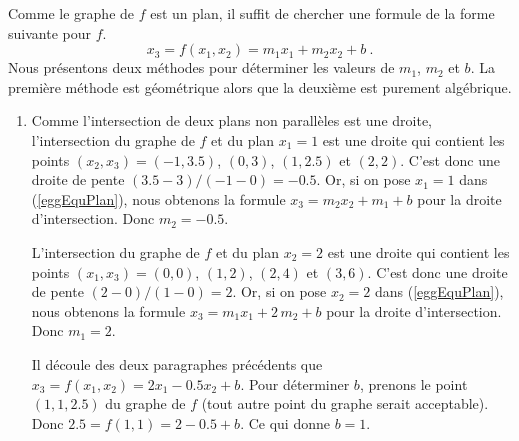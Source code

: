 {\begin{egg}
Comme le graphe de $f$ est un plan, il suffit de chercher une formule
de la forme suivante pour $f$.
\begin{equation}\label{eggEquPlan}
  x_3 = f(x_1,x_2)=m_1 x_1 + m_2 x_2 + b \ .
\end{equation}
Nous présentons deux méthodes pour déterminer les valeurs de $m_1$,
$m_2$ et $b$.  La première méthode est géométrique alors que la
deuxième est purement algébrique.

\begin{enumerate}
\item  Comme l'intersection de deux plans non parallèles est une droite,
l'intersection du graphe de $f$ et du plan $x_1=1$ est une droite qui
contient les points $(x_2,x_3) = (-1, 3.5)$, $(0,3)$, $(1,2.5)$ et
$(2,2)$.  C'est donc une droite de pente
$(3.5-3)/(-1-0) = -0.5$.  Or, si on pose $x_1=1$ dans
(\ref{eggEquPlan}), nous obtenons la formule
$x_3= m_2 x_2 + m_1 + b$ pour la droite d'intersection.  Donc
$m_2 = -0.5$.

L'intersection du graphe de $f$ et du plan $x_2=2$ est une droite qui
contient les points $(x_1,x_3) = (0, 0)$, $(1,2)$, $(2,4)$ et $(3,6)$.
C'est donc une droite de pente $(2-0)/(1-0) = 2$.
Or, si on pose $x_2=2$ dans (\ref{eggEquPlan}), nous
obtenons la formule $x_3= m_1x_1 + 2 \, m_2 + b$ pour la droite
d'intersection.  Donc $m_1 = 2$.

Il découle des deux paragraphes précédents que
$x_3=f(x_1,x_2) = 2x_1 -0.5 x_2 + b$.  Pour
déterminer $b$, prenons le point $(1,1, 2.5)$ du graphe de $f$ (tout
autre point du graphe serait acceptable).  Donc
$2.5 = f(1,1) = 2 -0.5 + b$.  Ce qui donne $b=1$.


\end{enumerate}
\end{egg}}
